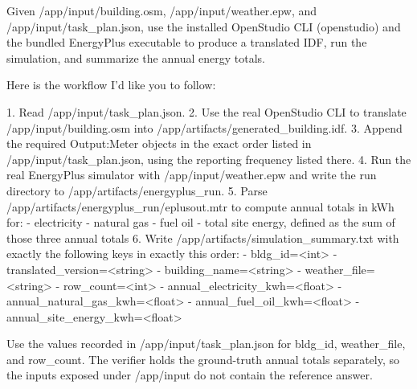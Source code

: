 \documentclass{llmxive}
\begin{document}
\begin{instructionbox}
Given \textasciigrave{}/app/input/building.osm\textasciigrave{}, \textasciigrave{}/app/input/weather.epw\textasciigrave{}, and \textasciigrave{}/app/input/task\_plan.json\textasciigrave{}, use the installed OpenStudio CLI (\textasciigrave{}openstudio\textasciigrave{}) and the bundled EnergyPlus executable to produce a translated IDF, run the simulation, and summarize the annual energy totals.

Here is the workflow I'd like you to follow:

1. Read \textasciigrave{}/app/input/task\_plan.json\textasciigrave{}.
2. Use the real OpenStudio CLI to translate \textasciigrave{}/app/input/building.osm\textasciigrave{} into \textasciigrave{}/app/artifacts/generated\_building.idf\textasciigrave{}.
3. Append the required \textasciigrave{}Output:Meter\textasciigrave{} objects in the exact order listed in \textasciigrave{}/app/input/task\_plan.json\textasciigrave{}, using the reporting frequency listed there.
4. Run the real EnergyPlus simulator with \textasciigrave{}/app/input/weather.epw\textasciigrave{} and write the run directory to \textasciigrave{}/app/artifacts/energyplus\_run\textasciigrave{}.
5. Parse \textasciigrave{}/app/artifacts/energyplus\_run/eplusout.mtr\textasciigrave{} to compute annual totals in kWh for:
   - electricity
   - natural gas
   - fuel oil
   - total site energy, defined as the sum of those three annual totals
6. Write \textasciigrave{}/app/artifacts/simulation\_summary.txt\textasciigrave{} with exactly the following keys in exactly this order:
   - \textasciigrave{}bldg\_id=\textless{}int\textgreater{}\textasciigrave{}
   - \textasciigrave{}translated\_version=\textless{}string\textgreater{}\textasciigrave{}
   - \textasciigrave{}building\_name=\textless{}string\textgreater{}\textasciigrave{}
   - \textasciigrave{}weather\_file=\textless{}string\textgreater{}\textasciigrave{}
   - \textasciigrave{}row\_count=\textless{}int\textgreater{}\textasciigrave{}
   - \textasciigrave{}annual\_electricity\_kwh=\textless{}float\textgreater{}\textasciigrave{}
   - \textasciigrave{}annual\_natural\_gas\_kwh=\textless{}float\textgreater{}\textasciigrave{}
   - \textasciigrave{}annual\_fuel\_oil\_kwh=\textless{}float\textgreater{}\textasciigrave{}
   - \textasciigrave{}annual\_site\_energy\_kwh=\textless{}float\textgreater{}\textasciigrave{}

Use the values recorded in \textasciigrave{}/app/input/task\_plan.json\textasciigrave{} for \textasciigrave{}bldg\_id\textasciigrave{}, \textasciigrave{}weather\_file\textasciigrave{}, and \textasciigrave{}row\_count\textasciigrave{}. The verifier holds the ground-truth annual totals separately, so the inputs exposed under \textasciigrave{}/app/input\textasciigrave{} do not contain the reference answer.


\end{instructionbox}
\end{document}
